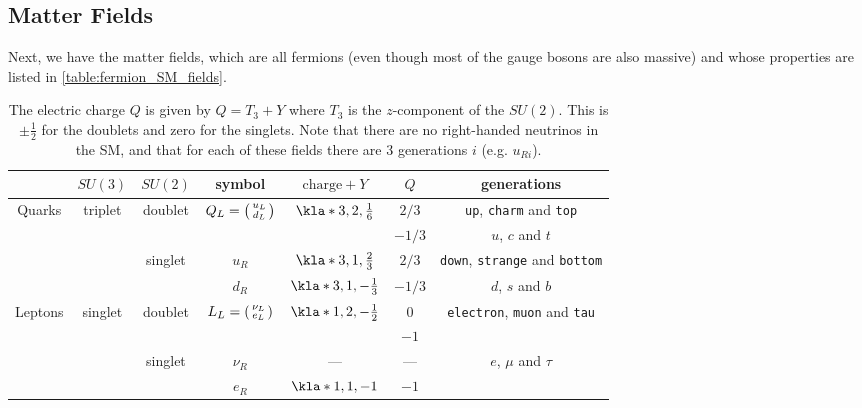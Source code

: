 \documentclass[english, parskip=full]{scrbook}
\begin{document}
\subsection{Matter Fields}
Next, we have the matter fields, which are all fermions (even though most of the gauge bosons are also massive) and whose properties are listed in \autoref{table:fermion_SM_fields}.
\begin{table}[!htp]
\centering
\begin{tabular}{*{7}{c}}\toprule
 & $SU(3)$ & $SU(2)$ & symbol & $\text{charge}+Y$ & $Q$ & generations \\ \midrule
\multirow{4}{*}{Quarks} & \multirow{4}{*}{triplet} & \multirow{2}{*}{doublet} & \multirow{2}{*}{$Q_L=\begin{psmallmatrix} u_L \\ d_L \end{psmallmatrix}$} & \multirow{2}{*}{$\kla*{3,2,\frac{1}{6}}$} & $2/3$ & \texttt{up}, \texttt{charm} and \texttt{top} \\
 &  &  &  &  & $-1/3$ & $u$, $c$ and $t$ \\
  &  & \multirow{2}{*}{singlet} & $u_R$ & $\kla*{3,1,\frac{2}{3}}$ & $2/3$ & \texttt{down}, \texttt{strange} and \texttt{bottom}\\
  &  &  & $d_R$ & $\kla*{3,1,-\frac{1}{3}}$ & $-1/3$ & $d$, $s$ and $b$ \\ \midrule
\multirow{4}{*}{Leptons} & \multirow{4}{*}{singlet} & \multirow{2}{*}{doublet} & \multirow{2}{*}{$L_L=\begin{psmallmatrix} \nu_L \\ e_L \end{psmallmatrix}$} & \multirow{2}{*}{$\kla*{1,2,-\frac{1}{2}}$} & $0$ & \multirow{2}{*}{\texttt{electron}, \texttt{muon} and \texttt{tau}} \\
 &  &  &  &  & $-1$ & \\
  &  & \multirow{2}{*}{singlet} & $\nu_R$ & --- & --- & \multirow{2}{*}{$e$, $\mu$ and $\tau$} \\
  &  &  & $e_R$ & $\kla*{1,1,-1}$ & $-1$ & \\ \bottomrule
\end{tabular}
\caption{The electric charge $Q$ is given by $Q=T_3+Y$ where $T_3$ is the $z$-component of the $SU(2)$.
This is $\pm \frac{1}{2}$ for the doublets and zero for the singlets.
Note that there are no right-handed neutrinos in the SM, and that for each of these fields there are 3 generations $i$ (e.g. $u_{Ri}$).}
\label{table:fermion_SM_fields}
\end{table}
\end{document}

